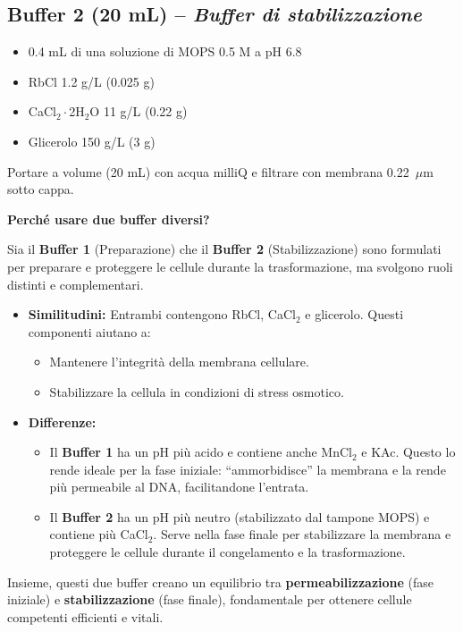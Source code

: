 \subsection*{Buffer 2 (20 mL) – \textit{Buffer di stabilizzazione}}
\begin{itemize}\footnotesize
  \item 0.4 mL di una soluzione di MOPS 0.5 M a pH 6.8
  \item RbCl 1.2 g/L (0.025 g)
  \item CaCl$_2\cdot$2H$_2$O 11 g/L (0.22 g)
  \item Glicerolo 150 g/L (3 g)
\end{itemize}
Portare a volume (20 mL) con acqua milliQ e filtrare con membrana 0.22~$\mu$m sotto cappa.

\begin{percheBox}
  \textbf{Perché usare due buffer diversi?}

  Sia il \textbf{Buffer 1} (Preparazione) che il \textbf{Buffer 2} (Stabilizzazione) sono formulati per preparare e proteggere le cellule durante la trasformazione, ma svolgono ruoli distinti e complementari.

  \begin{itemize}\footnotesize
    \item \textbf{Similitudini:} Entrambi contengono RbCl, CaCl$_2$ e glicerolo. Questi componenti aiutano a:
      \begin{itemize}
        \item Mantenere l’integrità della membrana cellulare.
        \item Stabilizzare la cellula in condizioni di stress osmotico.
      \end{itemize}

    \item \textbf{Differenze:}
      \begin{itemize}
        \item Il \textbf{Buffer 1} ha un pH più acido e contiene anche MnCl$_2$ e KAc. Questo lo rende ideale per la fase iniziale: “ammorbidisce” la membrana e la rende più permeabile al DNA, facilitandone l’entrata.
        \item Il \textbf{Buffer 2} ha un pH più neutro (stabilizzato dal tampone MOPS) e contiene più CaCl$_2$. Serve nella fase finale per stabilizzare la membrana e proteggere le cellule durante il congelamento e la trasformazione.
      \end{itemize}
  \end{itemize}

  Insieme, questi due buffer creano un equilibrio tra \textbf{permeabilizzazione} (fase iniziale) e \textbf{stabilizzazione} (fase finale), fondamentale per ottenere cellule competenti efficienti e vitali.
\end{percheBox}

